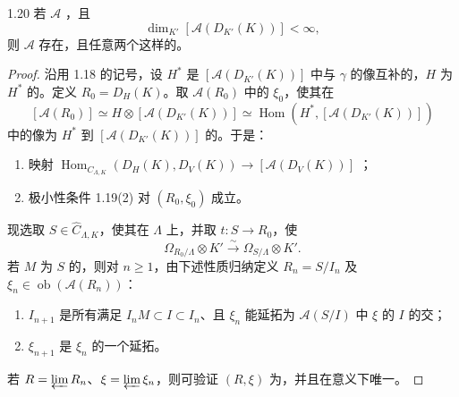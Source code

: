 \begin{SGAresult}{}{1.20}
若 $\mathcal A$ ，且
\[\dim_{K'}[\mathcal A(D_{K'}(K))]<\infty,\]
则 $\mathcal A$ 存在，且任意两个这样的。
\end{SGAresult}
\begin{proof}
沿用 1.18 的记号，设 $H^*$ 是 $[\mathcal A(D_{K'}(K))]$ 中与 $\gamma$ 的像互补的，$H$ 为 $H^*$ 的。定义 $R_0=D_H(K)$。取 $\mathcal A(R_0)$ 中的 $\xi_0$，使其在
\[[\mathcal A(R_0)]\simeq H\otimes[\mathcal A(D_{K'}(K))]
\simeq\operatorname{Hom}(H^*,[\mathcal A(D_{K'}(K))])\]
中的像为 $H^*$ 到 $[\mathcal A(D_{K'}(K))]$ 的。于是：
\begin{enumerate}
\item[(1)] 映射 $\operatorname{Hom}_{C_{\Lambda,K}}(D_H(K),D_V(K))\to[\mathcal A(D_V(K))]$ ；
\item[(2)] 极小性条件 1.19(2) 对 $(R_0,\xi_0)$ 成立。
\end{enumerate}
现选取 $S\in\widehat C_{\Lambda,K}$，使其在 $\Lambda$ 上，并取 $t:S\to R_0$，使
\[\Omega_{R_0/\Lambda}\otimes K'\xrightarrow\sim\Omega_{S/\Lambda}\otimes K'.\]
若 $M$ 为 $S$ 的，则对 $n\geq1$，由下述性质归纳定义 $R_n=S/I_n$ 及 $\xi_n\in\operatorname{ob}(\mathcal A(R_n))$：
\begin{enumerate}
\item[(a)] $I_{n+1}$ 是所有满足 $I_nM\subset I\subset I_n$、且 $\xi_n$ 能延拓为 $\mathcal A(S/I)$ 中 $\xi$ 的 $I$ 的交；
\item[(b)] $\xi_{n+1}$ 是 $\xi_n$ 的一个延拓。
\end{enumerate}
若 $R=\varprojlim R_n$、$\xi=\varprojlim\xi_n$，则可验证 $(R,\xi)$ 为，并且在意义下唯一。
\end{proof}
